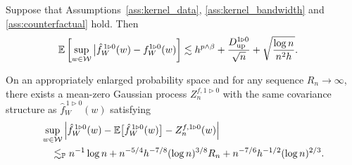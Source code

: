 \begin{lemma}
  \label{lem:counterfactual_uniform_consistency}

  Suppose that Assumptions~\ref{ass:kernel_data},
  \ref{ass:kernel_bandwidth} and \ref{ass:counterfactual} hold.
  Then
  \begin{align*}
    \mathbb{E}\left[
      \sup_{w \in \mathcal{W}}
      \big|\hat f_W^{\,1 \triangleright 0}(w)
      - f_W^{1 \triangleright 0}(w)
    \right]
    &\lesssim
    h^{p \wedge \beta}
    + \frac{D_{\textup{up}}^{1 \triangleright 0}}{\sqrt n}
    + \sqrt{\frac{\log n}{n^2h}}.
  \end{align*}

\end{lemma}

\begin{lemma}
  \label{lem:counterfactual_sa}

  On an appropriately enlarged probability space
  and for any sequence $R_n \to \infty$,
  there exists a mean-zero Gaussian process
  $Z_n^{f, 1 \triangleright 0}$
  with the same covariance structure as
  $\hat f_W^{\,1 \triangleright 0}(w)$ satisfying
  \begin{align*}
    &\sup_{w \in \mathcal{W}}
    \left|
    \hat f_W^{\,1 \triangleright 0}(w)
    - \mathbb{E}\big[\hat f_W^{\,1 \triangleright 0}(w)\big]
    - Z_n^{f, 1 \triangleright 0}(w)
    \right| \\
    &\quad\lesssim_{\mathbb{P}}
    n^{-1} \log n
    + n^{-5/4} h^{-7/8} (\log n)^{3/8} R_n
    + n^{-7/6} h^{-1/2} (\log n)^{2/3}.
  \end{align*}

\end{lemma}

